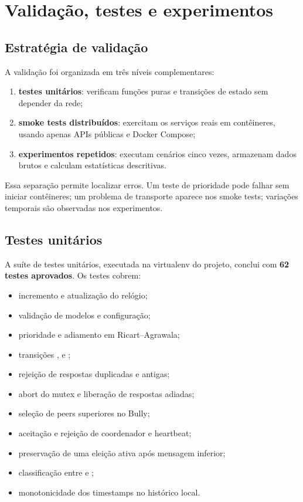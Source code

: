 \section{Validação, testes e experimentos}
\label{sec:validacao}

\subsection{Estratégia de validação}

A validação foi organizada em três níveis complementares:

\begin{enumerate}
    \item \textbf{testes unitários}: verificam funções puras e transições de estado sem depender da rede;
    \item \textbf{smoke tests distribuídos}: exercitam os serviços reais em contêineres, usando apenas APIs públicas e Docker Compose;
    \item \textbf{experimentos repetidos}: executam cenários cinco vezes, armazenam dados brutos e calculam estatísticas descritivas.
\end{enumerate}

Essa separação permite localizar erros. Um teste de prioridade pode falhar sem iniciar contêineres; um problema de transporte aparece nos smoke tests; variações temporais são observadas nos experimentos.

\subsection{Testes unitários}

A suíte de testes unitários, executada na virtualenv do projeto, conclui com \textbf{62 testes aprovados}. Os testes cobrem:

\begin{itemize}
    \item incremento e atualização do relógio;
    \item validação de modelos e configuração;
    \item prioridade e adiamento em Ricart--Agrawala;
    \item transições ,  e ;
    \item rejeição de respostas duplicadas e antigas;
    \item abort do mutex e liberação de respostas adiadas;
    \item seleção de peers superiores no Bully;
    \item aceitação e rejeição de coordenador e heartbeat;
    \item preservação de uma eleição ativa após mensagem inferior;
    \item classificação entre  e ;
    \item monotonicidade dos timestamps no histórico local.
\end{itemize}

